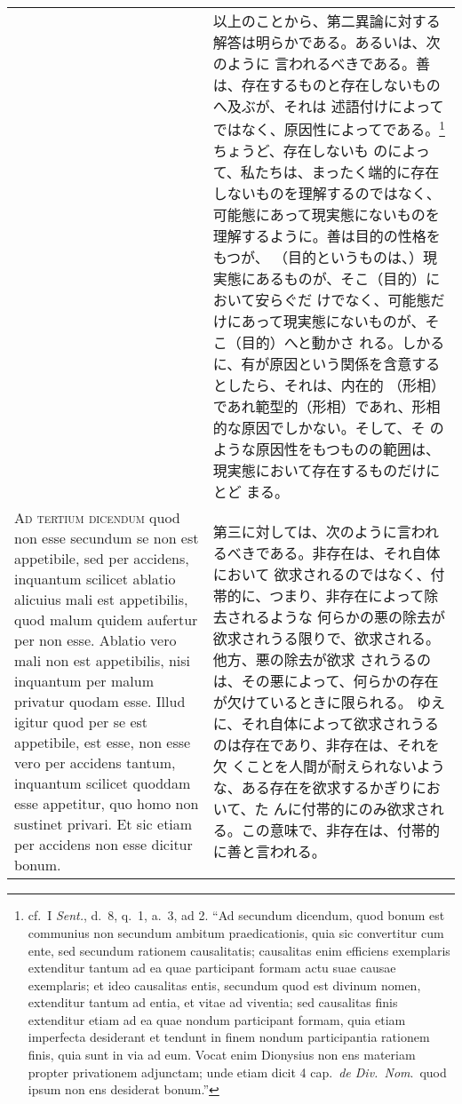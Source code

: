 \documentclass[10pt]{jsarticle} %
\begin{document}
\begin{longtable}{p{21em}p{21em}}
&

以上のことから、第二異論に対する解答は明らかである。あるいは、次のように
 言われるべきである。善は、存在するものと存在しないものへ及ぶが、それは
 述語付けによってではなく、原因性によってである。\footnote{cf.~I
 {\itshape Sent.}, d.~8, q.~1, a.~3, ad 2. ``Ad secundum dicendum, quod
 bonum est communius non secundum ambitum praedicationis, quia sic
 convertitur cum ente, sed secundum rationem causalitatis; causalitas
 enim efficiens exemplaris extenditur tantum ad ea quae participant
 formam actu suae causae exemplaris; et ideo causalitas entis, secundum
 quod est divinum nomen, extenditur tantum ad entia, et vitae ad
 viventia; sed causalitas finis extenditur etiam ad ea quae nondum
 participant formam, quia etiam imperfecta desiderant et tendunt in
 finem nondum participantia rationem finis, quia sunt in via ad
 eum. Vocat enim Dionysius non ens materiam propter privationem
 adjunctam; unde etiam dicit 4 cap.~{\itshape de Div.~Nom}.~quod ipsum non ens
 desiderat bonum.''}ちょうど、存在しないも
 のによって、私たちは、まったく端的に存在しないものを理解するのではなく、
 可能態にあって現実態にないものを理解するように。善は目的の性格をもつが、
 （目的というものは、）現実態にあるものが、そこ（目的）において安らぐだ
 けでなく、可能態だけにあって現実態にないものが、そこ（目的）へと動かさ
 れる。しかるに、有が原因という関係を含意するとしたら、それは、内在的
 （形相）であれ範型的（形相）であれ、形相的な原因でしかない。そして、そ
 のような原因性をもつものの範囲は、現実態において存在するものだけにとど
 まる。

\\



{\scshape Ad tertium dicendum} quod non esse secundum se non est
 appetibile, sed per accidens, inquantum scilicet ablatio alicuius mali
 est appetibilis, quod malum quidem aufertur per non esse. Ablatio vero
 mali non est appetibilis, nisi inquantum per malum privatur quodam
 esse. Illud igitur quod per se est appetibile, est esse, non esse vero
 per accidens tantum, inquantum scilicet quoddam esse appetitur, quo
 homo non sustinet privari. Et sic etiam per accidens non esse dicitur
 bonum.

&

第三に対しては、次のように言われるべきである。非存在は、それ自体において
 欲求されるのではなく、付帯的に、つまり、非存在によって除去されるような
 何らかの悪の除去が欲求されうる限りで、欲求される。他方、悪の除去が欲求
 されうるのは、その悪によって、何らかの存在が欠けているときに限られる。
 ゆえに、それ自体によって欲求されうるのは存在であり、非存在は、それを欠
 くことを人間が耐えられないような、ある存在を欲求するかぎりにおいて、た
 んに付帯的にのみ欲求される。この意味で、非存在は、付帯的に善と言われる。


\end{longtable}
\end{document}
